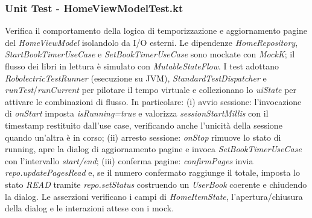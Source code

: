 \documentclass{article}
\begin{document}
\subsubsection{Unit Test - HomeViewModelTest.kt}
Verifica il comportamento della logica di temporizzazione e aggiornamento pagine del \textit{HomeViewModel} isolandolo da I/O esterni. Le dipendenze \textit{HomeRepository}, \textit{StartBookTimerUseCase} e \textit{SetBookTimerUseCase} sono mockate con \textit{MockK}; il flusso dei libri in lettura è simulato con \textit{MutableStateFlow}. I test adottano \textit{RobolectricTestRunner} (esecuzione su JVM), \textit{StandardTestDispatcher} e \textit{runTest}/\textit{runCurrent} per pilotare il tempo virtuale e collezionano lo \textit{uiState} per attivare le combinazioni di flusso.
In particolare: 
(i) avvio sessione: l’invocazione di \textit{onStart} imposta \textit{isRunning=true} e valorizza \textit{sessionStartMillis} con il timestamp restituito dall’use case, verificando anche l’unicità della sessione quando un’altra è in corso; 
(ii) arresto sessione: \textit{onStop} rimuove lo stato di running, apre la dialog di aggiornamento pagine e invoca \textit{SetBookTimerUseCase} con l’intervallo \textit{start/end}; 
(iii) conferma pagine: \textit{confirmPages} invia \textit{repo.updatePagesRead} e, se il numero confermato raggiunge il totale, imposta lo stato \textit{READ} tramite \textit{repo.setStatus} costruendo un \textit{UserBook} coerente e chiudendo la dialog. Le asserzioni verificano i campi di \textit{HomeItemState}, l’apertura/chiusura della dialog e le interazioni attese con i mock.
\end{document}
